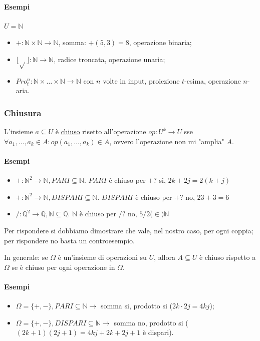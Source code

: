 \documentclass{article}
\begin{document}
\paragraph{Esempi} $U=\mathbb{N}$
\begin{itemize}
	\item $+:\mathbb{N} \times \mathbb{N} \rightarrow \mathbb{N}$, somma: $+(5,3)=8$, operazione binaria;
	\item $\lfloor \sqrt{} \rfloor: \mathbb{N} \rightarrow \mathbb{N}$, radice troncata, operazione unaria;
	\item $Pro_t^n: \mathbb{N} \times \dots \times \mathbb{N} \rightarrow \mathbb{N}$ con $n$ volte in input, proiezione $t$-esima, operazione $n$-aria.
\end{itemize}
\subsubsection{Chiusura}
L'insieme $a \subseteq U$ è \underline{chiuso} risetto all'operazione $op:U^k \rightarrow U$ sse $\forall a_1, \dots, a_k \in A: op(a_1, \dots, a_k) \in A$, ovvero l'operazione non mi "amplia" $A$.
\paragraph{Esempi}
\begin{itemize}
	\item $+: \mathbb{N}^2 \rightarrow \mathbb{N}, PARI \subseteq \mathbb{N}$. $PARI$ è chiuso per $+$? si, $2k + 2j =2(k+j)$
	\item $+: \mathbb{N}^2 \rightarrow \mathbb{N}, DISPARI \subseteq \mathbb{N}$. $DISPARI$ è chiuso per $+$? no, $23+3=6$
	\item $/: \mathbb{Q}^2 \rightarrow \mathbb{Q}, \mathbb{N} \subseteq \mathbb{Q}$. $\mathbb{N}$ è chiuso per $/$? no, $5/2 \bar(\in) \mathbb{N}$
\end{itemize}
Per rispondere si dobbiamo dimostrare che vale, nel nostro caso, per ogni coppia; per rispondere no basta un controesempio.




In generale: se $\Omega$ è un'insieme di operazioni su $U$, allora $A \subseteq U$ è chiuso rispetto a $\Omega$ se è chiuso per ogni operazione in $\Omega$.
\paragraph{Esempi}
\begin{itemize}
	\item $\Omega = \{ +, - \}, PARI \subseteq \mathbb{N} \rightarrow$ somma si, prodotto si ($2k \cdot 2j = 4kj$);
	\item $\Omega = \{ +, - \}, DISPARI \subseteq \mathbb{N} \rightarrow$ somma no, prodotto si ( $(2k+1)  (2j+1) = 4kj+2k+2j+1$ è dispari).
\end{itemize}
\end{document}
